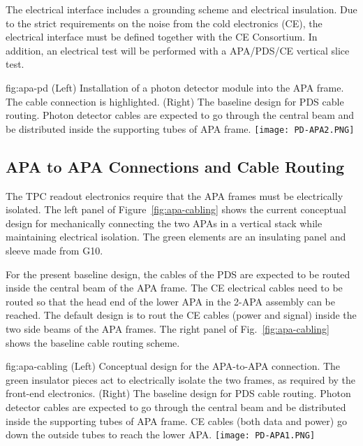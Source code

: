 The electrical interface includes a grounding scheme and electrical insulation. Due to the strict requirements on the noise from the cold electronics (CE), the electrical interface must be defined together with the CE Consortium. In addition, an electrical test will be performed with a APA/PDS/CE vertical slice test. 

\begin{dunefigure}{fig:apa-pd}
{(Left) Installation of a photon detector module into the APA frame. The cable connection is highlighted. (Right) The baseline design for PDS cable routing. Photon detector cables are expected to go through the central beam and be distributed inside the supporting tubes of APA frame.}
\texttt{[image: PD-APA2.PNG]}
\end{dunefigure}


\subsection{APA to APA Connections and Cable Routing}

The TPC readout electronics require that the APA frames must be electrically isolated.  The left panel of Figure~\ref{fig:apa-cabling} shows the current conceptual design for mechanically connecting the two APAs in a vertical stack while maintaining electrical isolation.  The green elements are an insulating panel and sleeve made from G10. 

For the present baseline design, the cables of the PDS are expected to be routed inside the central beam of the APA frame.  The CE electrical cables need to be routed so that the head end of the lower APA in the 2-APA assembly can be reached. The default design is to rout the CE cables (power and signal) inside the two side beams of the APA frames. The right panel of Fig.~\ref{fig:apa-cabling} shows the baseline cable routing scheme.     

\begin{dunefigure}{fig:apa-cabling}
{(Left) Conceptual design for the APA-to-APA connection.  The green insulator pieces act to electrically isolate the two frames, as required by the front-end electronics.  (Right) The baseline design for PDS cable routing. Photon detector cables are expected to go through the central beam and be distributed inside the supporting tubes of APA frame.  CE cables (both data and power) go down the outside tubes to reach the lower APA.}
\setlength{\fboxsep}{0pt}
\setlength{\fboxrule}{0.5pt}
\qquad \quad
\texttt{[image: PD-APA1.PNG]}
\end{dunefigure}

